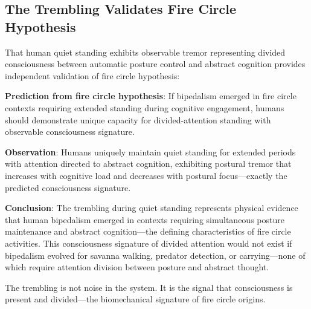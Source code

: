 \subsection{The Trembling Validates Fire Circle Hypothesis}

That human quiet standing exhibits observable tremor representing divided consciousness between automatic posture control and abstract cognition provides independent validation of fire circle hypothesis:

\textbf{Prediction from fire circle hypothesis}: If bipedalism emerged in fire circle contexts requiring extended standing during cognitive engagement, humans should demonstrate unique capacity for divided-attention standing with observable consciousness signature.

\textbf{Observation}: Humans uniquely maintain quiet standing for extended periods with attention directed to abstract cognition, exhibiting postural tremor that increases with cognitive load and decreases with postural focus—exactly the predicted consciousness signature.

\textbf{Conclusion}: The trembling during quiet standing represents physical evidence that human bipedalism emerged in contexts requiring simultaneous posture maintenance and abstract cognition—the defining characteristics of fire circle activities. This consciousness signature of divided attention would not exist if bipedalism evolved for savanna walking, predator detection, or carrying—none of which require attention division between posture and abstract thought.

The trembling is not noise in the system. It is the signal that consciousness is present and divided—the biomechanical signature of fire circle origins.
